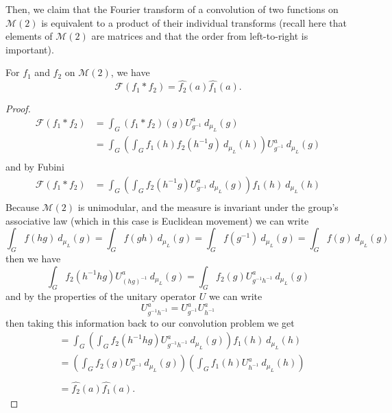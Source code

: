 \documentclass{article}
\begin{document}
Then, we claim that the Fourier transform of a convolution of two functions on $\mathcal{M}(2)$ is equivalent to a product of their individual transforms (recall here that elements of $\mathcal{M}(2)$ are matrices and that the order from left-to-right is important).
\begin{theorem}
    For $f_1$ and $f_2$ on $\mathcal{M}(2)$, we have
    \[%
        \mathcal{F}(f_1 * f_2) = \hat{f_2}(a) \hat{f_1}(a)
    .\]%
\end{theorem}

\begin{proof}
    \[%
        \begin{split}
            \mathcal{F}(f_1 * f_2) &= \int_{G} (f_1 * f_2)(g) U^{a}_{g^{-1}} \ d_{\mu_{L}}(g) \\
                                   &= \int_{G} \left( \int_{G} 
                                       f_1(h) f_2(h^{-1}g) 
                                       \ d_{\mu_{L}}(h) \right) U^{a}_{g^{-1}}\ d_{\mu_{L}}(g) \\
        \end{split} 
    \]%
    and by Fubini
    \[%
         \begin{split}
            \mathcal{F}(f_1 * f_2) 
                                   &= \int_{G} \left( \int_{G} 
                                       f_2(h^{-1}g) U^{a}_{g^{-1}}\ d_{\mu_{L}}(g)\right) 
                                       f_1(h) \ d_{\mu_{L}}(h)  \\
        \end{split} 
    \]%
    Because $\mathcal{M}(2)$ is unimodular, and the measure is invariant under the group's associative law (which in this case is Euclidean movement) we can write
    \[%
        \int_{G} f(hg) \ d_{\mu_{L}}(g) =
        \int_{G} f(gh) \ d_{\mu_{L}}(g) =
        \int_{G} f(g^{-1}) \ d_{\mu_{L}}(g) =
        \int_{G} f(g) \ d_{\mu_{L}}(g)
    \]%
    then we have
    \[%
        \int_{G} f_2(h^{-1}hg) U^{a}_{(hg)^{-1}}\ d_{\mu_{L}}(g) =
        \int_{G} f_2(g) U^{a}_{g^{-1}h^{-1}}\ d_{\mu_{L}}(g) 
    \]%
    and by the properties of the unitary operator $U$ we can write
    \[%
        U^{a}_{g^{-1}h^{-1}} = U^{a}_{g^{-1}} U^{a}_{h^{-1}}
    \]%
    then taking this information back to our convolution problem we get
    \[%
        \begin{split}
           &= \int_{G} 
           \left( \int_{G} f_2(h^{-1}hg) U^{a}_{g^{-1}h^{-1}}\ d_{\mu_{L}}(g)\right) 
               f_1(h) \ d_{\mu_{L}}(h)  \\
            &= 
               \left( \int_{G} f_2(g) U^{a}_{g^{-1}}\ d_{\mu_{L}}(g)\right) 
               \left(\int_{G} f_1(h) U^{a}_{h^{-1}}\ d_{\mu_{L}}(h)\right)  \\
            \\
            &= \hat{f_2}(a) \hat{f_1}(a).
        \end{split} 
    \]%
\end{proof}
\end{document}
